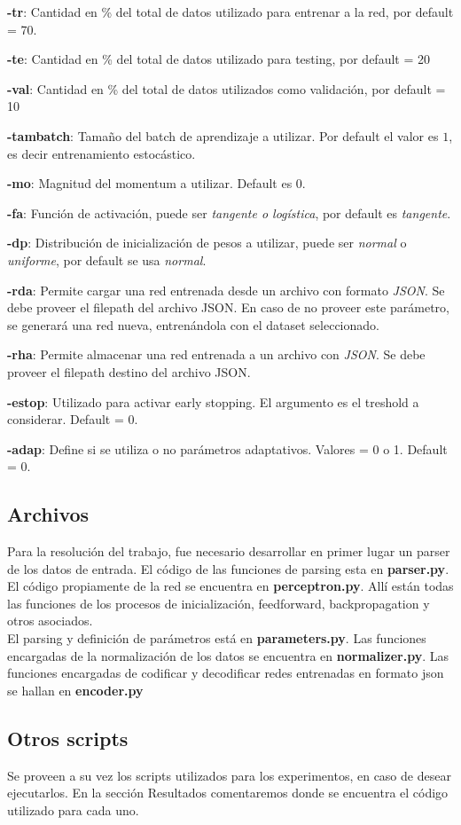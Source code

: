 \textbf{-tr}:  Cantidad en \% del total de datos utilizado para entrenar a la red, por default = 70.

\textbf{-te}: Cantidad en \% del total de datos utilizado para testing, por default = 20

\textbf{-val}: Cantidad en \% del total de datos utilizados como validación, por default = 10

\textbf{-tambatch}: Tamaño del batch de aprendizaje a utilizar. Por default el valor es $1$, es decir entrenamiento estocástico.

\textbf{-mo}: Magnitud del momentum a utilizar. Default es 0.

\textbf{-fa}: Función de activación, puede ser \textit{tangente o logística}, por default es \textit{tangente}.

\textbf{-dp}: Distribución de inicialización de pesos a utilizar, puede ser \textit{normal} o \textit{uniforme}, por default se usa \textit{normal}.

\textbf{-rda}: Permite cargar una red entrenada desde un archivo con formato \textit{JSON}. Se debe proveer el filepath del archivo JSON. En caso de no proveer este parámetro, se generará una red nueva, entrenándola con el dataset seleccionado.

\textbf{-rha}: Permite almacenar una red entrenada a un archivo con \textit{JSON}. Se debe proveer el filepath destino del archivo JSON.

\textbf{-estop}: Utilizado para activar early stopping. El argumento es el treshold a considerar. Default = 0.

\textbf{-adap}: Define si se utiliza o no parámetros adaptativos. Valores = 0 o 1. Default = 0.

\subsection{Archivos}
Para la resolución del trabajo, fue necesario desarrollar en primer lugar un parser de los datos de entrada. El código de las funciones de parsing esta en \textbf{parser.py}.\\

El código propiamente de la red se encuentra en \textbf{perceptron.py}. Allí están todas las funciones de los procesos de inicialización, feedforward, backpropagation y otros asociados.\\

El parsing y definición de parámetros está en \textbf{parameters.py}. Las funciones encargadas de la normalización de los datos se encuentra en \textbf{normalizer.py}. Las funciones encargadas de codificar y decodificar redes entrenadas en formato json se hallan en \textbf{encoder.py}\\

\subsection{Otros scripts}

Se proveen a su vez los scripts utilizados para los experimentos, en caso de desear ejecutarlos. En la sección Resultados comentaremos donde se encuentra el código utilizado para cada uno.
